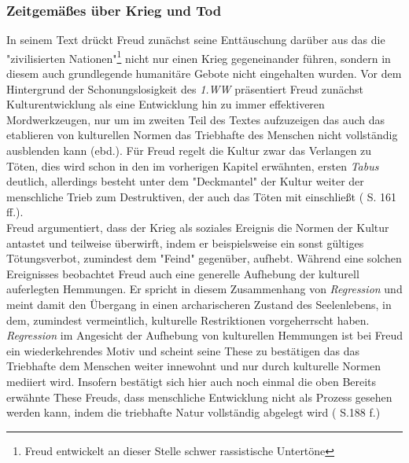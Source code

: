 \documentclass[11pt,a4paper,oneside,numbers=noenddot,bibliography=totocnumbered,DIV=13]{scrartcl}
\begin{document}
{\subsubsection{Zeitgemäßes über Krieg und Tod}
In seinem Text drückt Freud zunächst seine Enttäuschung darüber aus das die "zivilisierten Nationen"\footnote{Freud entwickelt an dieser Stelle schwer rassistische Untertöne} nicht nur einen Krieg gegeneinander führen, sondern in diesem auch grundlegende humanitäre Gebote nicht eingehalten wurden. Vor dem Hintergrund der Schonungslosigkeit des \textit{1.WW} präsentiert Freud zunächst Kulturentwicklung als eine Entwicklung hin zu immer effektiveren Mordwerkzeugen, nur um im zweiten Teil des Textes aufzuzeigen das auch das etablieren von kulturellen Normen das Triebhafte des Menschen nicht vollständig ausblenden kann (ebd.). Für Freud regelt die Kultur zwar das Verlangen zu Töten, dies wird schon in den im vorherigen Kapitel erwähnten, ersten \textit{Tabus} deutlich, allerdings besteht unter dem "Deckmantel" der Kultur weiter der menschliche Trieb zum Destruktiven, der auch das Töten mit einschließt (\cite{mccall_society--gang_2006} S. 161 ff.). \\
Freud argumentiert, dass der Krieg als soziales Ereignis die Normen der Kultur antastet und teilweise überwirft, indem er beispielsweise ein sonst gültiges Tötungsverbot, zumindest dem "Feind" gegenüber, aufhebt. Während eine solchen Ereignisses beobachtet Freud auch eine generelle Aufhebung der kulturell auferlegten Hemmungen. Er spricht in diesem Zusammenhang von \textit{Regression} und meint damit den Übergang in einen archarischeren Zustand des Seelenlebens, in dem, zumindest vermeintlich, kulturelle Restriktionen vorgeherrscht haben. \textit{Regression} im Angesicht der Aufhebung von kulturellen Hemmungen ist bei Freud ein wiederkehrendes Motiv und scheint seine These zu bestätigen das das Triebhafte dem Menschen weiter innewohnt und nur durch kulturelle Normen mediiert wird. Insofern bestätigt sich hier auch noch einmal die oben Bereits erwähnte These Freuds, dass menschliche Entwicklung nicht als Prozess gesehen werden kann, indem die triebhafte Natur vollständig abgelegt wird (\cite{lohmann_freud-handbuch:_2013} S.188 f.)\\
}
\end{document}

